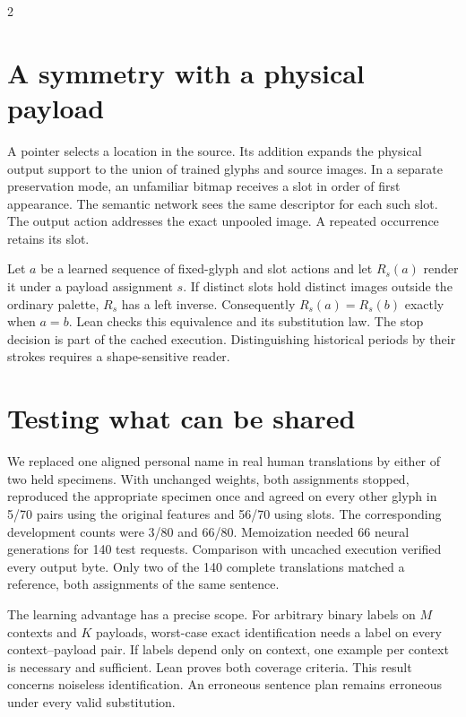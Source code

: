 \begin{multicols}{2}
\section*{A symmetry with a physical payload}
A pointer selects a location in the source. Its addition expands the physical output support to the union of trained glyphs and source images. In a separate preservation mode, an unfamiliar bitmap receives a slot in order of first appearance. The semantic network sees the same descriptor for each such slot. The output action addresses the exact unpooled image. A repeated occurrence retains its slot.
\par Let $a$ be a learned sequence of fixed-glyph and slot actions and let $R_s(a)$ render it under a payload assignment $s$. If distinct slots hold distinct images outside the ordinary palette, $R_s$ has a left inverse. Consequently $R_s(a)=R_s(b)$ exactly when $a=b$. Lean checks this equivalence and its substitution law. The stop decision is part of the cached execution. Distinguishing historical periods by their strokes requires a shape-sensitive reader.
\section*{Testing what can be shared}
We replaced one aligned personal name in real human translations by either of two held specimens. With unchanged weights, both assignments stopped, reproduced the appropriate specimen once and agreed on every other glyph in 5/70 pairs using the original features and 56/70 using slots. The corresponding development counts were 3/80 and 66/80. Memoization needed 66 neural generations for 140 test requests. Comparison with uncached execution verified every output byte. Only two of the 140 complete translations matched a reference, both assignments of the same sentence.
\par The learning advantage has a precise scope. For arbitrary binary labels on $M$ contexts and $K$ payloads, worst-case exact identification needs a label on every context--payload pair. If labels depend only on context, one example per context is necessary and sufficient. Lean proves both coverage criteria. This result concerns noiseless identification. An erroneous sentence plan remains erroneous under every valid substitution.
\end{multicols}
